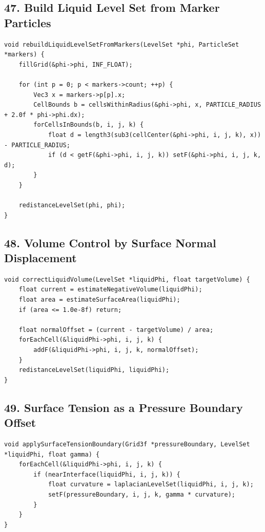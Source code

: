 \documentclass[10pt,letterpaper]{article}
\begin{document}
\subsection*{47. Build Liquid Level Set from Marker Particles}

\begin{verbatim}
void rebuildLiquidLevelSetFromMarkers(LevelSet *phi, ParticleSet *markers) {
    fillGrid(&phi->phi, INF_FLOAT);

    for (int p = 0; p < markers->count; ++p) {
        Vec3 x = markers->p[p].x;
        CellBounds b = cellsWithinRadius(&phi->phi, x, PARTICLE_RADIUS + 2.0f * phi->phi.dx);
        forCellsInBounds(b, i, j, k) {
            float d = length3(sub3(cellCenter(&phi->phi, i, j, k), x)) - PARTICLE_RADIUS;
            if (d < getF(&phi->phi, i, j, k)) setF(&phi->phi, i, j, k, d);
        }
    }

    redistanceLevelSet(phi, phi);
}
\end{verbatim}

\subsection*{48. Volume Control by Surface Normal Displacement}

\begin{verbatim}
void correctLiquidVolume(LevelSet *liquidPhi, float targetVolume) {
    float current = estimateNegativeVolume(liquidPhi);
    float area = estimateSurfaceArea(liquidPhi);
    if (area <= 1.0e-8f) return;

    float normalOffset = (current - targetVolume) / area;
    forEachCell(&liquidPhi->phi, i, j, k) {
        addF(&liquidPhi->phi, i, j, k, normalOffset);
    }
    redistanceLevelSet(liquidPhi, liquidPhi);
}
\end{verbatim}

\subsection*{49. Surface Tension as a Pressure Boundary Offset}

\begin{verbatim}
void applySurfaceTensionBoundary(Grid3f *pressureBoundary, LevelSet *liquidPhi, float gamma) {
    forEachCell(&liquidPhi->phi, i, j, k) {
        if (nearInterface(liquidPhi, i, j, k)) {
            float curvature = laplacianLevelSet(liquidPhi, i, j, k);
            setF(pressureBoundary, i, j, k, gamma * curvature);
        }
    }
}
\end{verbatim}
\end{document}
